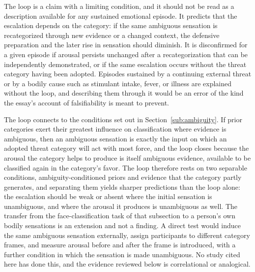 \documentclass[11pt]{article}
\begin{document}
The loop is a claim with a limiting condition, and it should not be read as a description available for any sustained emotional episode. It predicts that the escalation depends on the category: if the same ambiguous sensation is recategorized through new evidence or a changed context, the defensive preparation and the later rise in sensation should diminish. It is disconfirmed for a given episode if arousal persists unchanged after a recategorization that can be independently demonstrated, or if the same escalation occurs without the threat category having been adopted. Episodes sustained by a continuing external threat or by a bodily cause such as stimulant intake, fever, or illness are explained without the loop, and describing them through it would be an error of the kind the essay's account of falsifiability is meant to prevent.

The loop connects to the conditions set out in Section~\ref{sub:ambiguity}. If prior categories exert their greatest influence on classification where evidence is ambiguous, then an ambiguous sensation is exactly the input on which an adopted threat category will act with most force, and the loop closes because the arousal the category helps to produce is itself ambiguous evidence, available to be classified again in the category's favor. The loop therefore rests on two separable conditions, ambiguity-conditioned priors and evidence that the category partly generates, and separating them yields sharper predictions than the loop alone: the escalation should be weak or absent where the initial sensation is unambiguous, and where the arousal it produces is unambiguous as well. The transfer from the face-classification task of that subsection to a person's own bodily sensations is an extension and not a finding. A direct test would induce the same ambiguous sensation externally, assign participants to different category frames, and measure arousal before and after the frame is introduced, with a further condition in which the sensation is made unambiguous. No study cited here has done this, and the evidence reviewed below is correlational or analogical.
\end{document}
